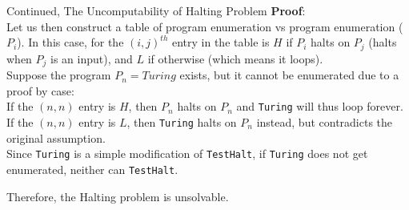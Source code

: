 \begin{ln-theorem}{Continued, The Uncomputability of Halting Problem}{}
    \textbf{Proof}: \\
    Let us then construct a table of program enumeration vs program enumeration ($P_i$). In this case, for the ${(i, j)}^{th}$ entry in the table is $H$ if $P_i$ halts on $P_j$ (halts when $P_j$ is an input), and $L$ if otherwise (which means it loops). \\
    Suppose the program $P_n = Turing$ exists, but it cannot be enumerated due to a proof by case: \\
    If the $(n, n)$ entry is $H$, then $P_n$ halts on $P_n$ and \verb+Turing+ will thus loop forever. \\
    If the $(n, n)$ entry is $L$, then \verb+Turing+ halts on $P_n$ instead, but contradicts the original assumption. \\

    Since \verb+Turing+ is a simple modification of \verb+TestHalt+, if \verb+Turing+ does not get enumerated, neither can \verb+TestHalt+.
\end{ln-theorem}
Therefore, the Halting problem is unsolvable.

